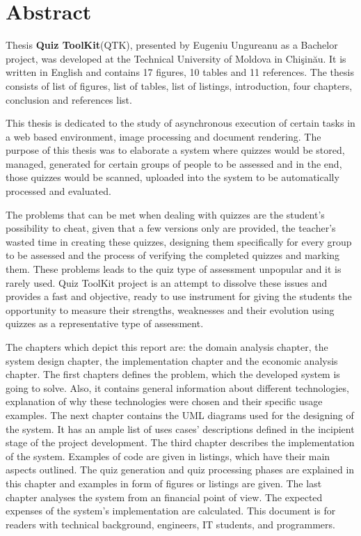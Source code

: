 \section*{Abstract}

Thesis {\bf Quiz ToolKit}(QTK), presented by Eugeniu Ungureanu as a Bachelor project, was developed at the Technical University of Moldova in Chi\c{s}in\u{a}u. It is written in English and contains 17 figures, 10 tables and 11 references. The thesis consists of list of figures, list of tables, list of listings, introduction, four chapters, conclusion and references list.

This thesis is dedicated to the study of asynchronous execution of certain tasks in a web based environment, image processing and document rendering. The purpose of this thesis was to elaborate a system where quizzes would be stored, managed, generated for certain groups of people to be assessed and in the end, those quizzes would be scanned, uploaded into the system to be automatically processed and evaluated.

The problems that can be met when dealing with quizzes are the student's possibility to cheat, given that a few versions only are provided, the teacher's wasted time in creating these quizzes, designing them specifically for every group to be assessed and the process of verifying the completed quizzes and marking them. These problems leads to the quiz type of assessment unpopular and it is rarely used. Quiz ToolKit project is an attempt to dissolve these issues and provides a fast and objective, ready to use instrument for giving the students the opportunity to measure their strengths, weaknesses and their evolution using quizzes as a representative type of assessment.  

The chapters which depict this report are: the domain analysis chapter, the system design chapter, the implementation chapter and the economic analysis chapter. The first chapters defines the problem, which the developed system is going to solve. Also, it contains general information about different technologies, explanation of why these technologies were chosen and their specific usage examples. The next chapter contains the UML diagrams used for the designing of the system. It has an ample list of uses cases' descriptions defined in the incipient stage of the project development. The third chapter describes the implementation of the system. Examples of code are given in listings, which have their main aspects outlined. The quiz generation and quiz processing phases are explained in this chapter and examples in form of figures or listings are given. The last chapter analyses the system from an financial point of view. The expected expenses of the system's implementation are calculated. This document is for readers with technical background, engineers, IT students, and programmers. 


